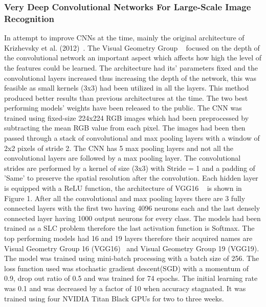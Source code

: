 \documentclass{csfyp}
\newcommand\tab[1][1cm]{\hspace*{#1}}
\begin{document}
\subsubsection{Very Deep Convolutional Networks For Large-Scale Image Recognition}
In attempt to improve CNNs at the time, mainly the original architecture of Krizhevsky et al. (2012)~\cite{NIPS2012_4824}. The Visual Geometry Group ~\cite{Simonyan14c} focused on the depth of the convolutional network an important aspect which affects how high the level of the features could be learned. The architecture had its’ parameters fixed and the convolutional layers increased thus increasing the depth of the network, this was feasible as small kernels (3x3) had been utilized in all the layers. This method produced better results than previous architectures at the time. The two best performing models’ weights have been released to the public. The CNN was trained using fixed-size 224x224 RGB images which had been preprocessed by subtracting the mean RGB value from each pixel. The images had been then passed through a stack of convolutional and max pooling layers with a window of 2x2 pixels of stride 2. The CNN has 5 max pooling layers and not all the convolutional layers are followed by a max pooling layer. The convolutional strides are performed by a kernel of size (3x3) with Stride = 1 and a padding of 'Same' to preserve the spatial resolution after the convolution. Each hidden layer is equipped with a ReLU function, the architecture of VGG16 ~\cite{Simonyan14c} is shown in Figure 1. After all the convolutional and max pooling layers there are 3 fully connected layers with the first two having 4096 neurons each and the last densely connected layer having 1000 output neurons for every class. The models had been trained as a SLC problem therefore the last activation function is Softmax. The top performing models had 16 and 19 layers therefore their acquired names are Visual Geometry Group 16 (VGG16)~\cite{Simonyan14c} and Visual Geometry Group 19 (VGG19).
\\
\tab
The model was trained using mini-batch processing with a batch size of 256. The loss function used was stochastic gradient descent(SGD) with a momentum of 0.9, drop out ratio of 0.5 and was trained for 74 epochs. The initial  learning rate was 0.1 and was decreased by a factor of 10 when accuracy stagnated. It was trained using four NVIDIA Titan Black GPUs for two to three weeks.
\\
\end{document}

